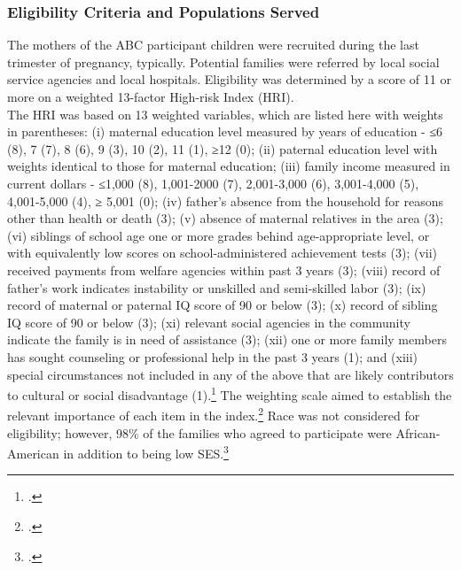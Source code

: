 \subsubsection{Eligibility Criteria and Populations Served}

\noindent The mothers of the ABC participant children were recruited during the last trimester  of pregnancy, typically. Potential families were referred by local social service agencies and local hospitals. Eligibility was determined by a score of 11 or more on a weighted 13-factor High-risk Index (HRI).\\ 

\noindent The HRI was based on 13 weighted variables, which are listed here with weights in parentheses: (i) maternal education level measured by years of education - ≤6 (8), 7 (7), 8 (6), 9 (3), 10 (2), 11 (1), ≥12 (0); (ii) paternal education level with weights identical to those for maternal education; (iii) family income measured in current dollars - ≤1,000 (8), 1,001-2000 (7), 2,001-3,000 (6), 3,001-4,000 (5), 4,001-5,000 (4), ≥ 5,001 (0); (iv) father’s absence from the household for reasons other than health or death (3); (v) absence of maternal relatives in the area (3); (vi) siblings of school age one or more grades behind age-appropriate level, or with equivalently low scores on school-administered achievement tests (3); (vii) received payments from welfare agencies within past 3 years (3); (viii) record of father's work indicates instability or unskilled and semi-skilled labor (3); (ix) record of maternal or paternal IQ score of 90 or below (3); (x) record of sibling IQ score of 90 or below (3); (xi) relevant social agencies in the community indicate the family is in need of assistance (3); (xii) one or more family members has sought counseling or professional help in the past 3 years (1); and (xiii) special circumstances not included in any of the above that are likely contributors to cultural or social disadvantage (1).\footnote{\citet{Ramey_Smith_1977_AJMD, Ramey_Campbell_1984_AJMD,Ramey_Campbell_1991_childreninpoverty,Ramey_Campbell_etal_2000_ADS}.} The weighting scale aimed to establish the relevant importance of each item in the index.\footnote{\citet{Ramey_Smith_1977_AJMD}.} Race was not  considered for eligibility; however, 98\% of the families who agreed to participate were African-American in addition to being low SES.\footnote{\citet{Ramey_Smith_1977_AJMD,Ramey_Campbell_1979_SR}.} \\


